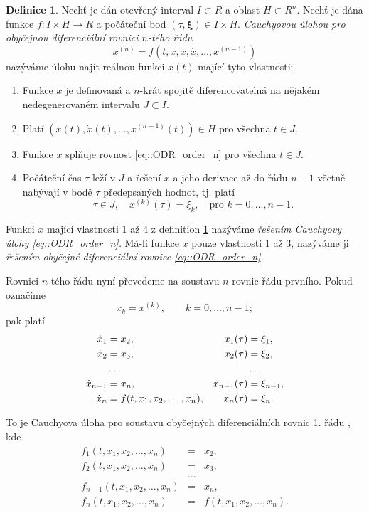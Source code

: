 \documentclass[a4paper, 12pt]{book}
\theoremstyle{definition}
\newtheorem{definition}[theorem]{Definice}
\def\to{\rightarrow}
\def\vc#1{\mathbf{\boldsymbol{#1}}}     %
\begin{document}
\begin{definition}
\label{def::rovnice_radu_n}
Nechť je dán otevřený interval $I\subset R$ a oblast $H\subset R^{n}$.  Nechť je dána funkce
$f:I\times H\to R$ a počáteční bod $(\tau, \vc \xi) \in I\times H$. \emph{Cauchyovou 
úlohou pro obyčejnou diferenciální rovnici $n$-tého řádu}
\begin{equation}
    \label{eq::ODR_order_n}
    x^{(n)} = f(t,x,\dot x, \ddot x,\dots,x^{(n-1)})
\end{equation}
nazýváme úlohu najít reálnou funkci $x(t)$ mající tyto vlastnosti:
\begin{enumerate}
\item Funkce $x$ je definovaná a $n$-krát spojitě diferencovatelná na nějakém
nedegenerovaném intervalu $J\subset I$.
\item Platí $(x(t),\dot x(t),\dots, x^{(n-1)}(t))\in H$ pro všechna $t\in J$.
\item Funkce $x$ splňuje rovnost \eqref{eq::ODR_order_n}
pro všechna $t\in J$.
\item Počáteční čas $\tau$ leží v $J$ a řešení $x$ a jeho derivace až do
řádu $n-1$ včetně nabývají v bodě $\tau$ předepsaných hodnot, tj. platí
\[
\tau\in J,\quad x^{(k)}(\tau)=\xi_k, \quad \text{pro } k=0,\dots, n-1.
\]
\end{enumerate}
\end{definition}

Funkci $x$ mající vlastnosti 1 až 4 z definition \ref{def::rovnice_radu_n} nazýváme 
\emph{řešením Cauchyovy úlohy \eqref{eq::ODR_order_n}.} Má-li funkce $x$ pouze vlastnosti
1 až 3, nazýváme ji \emph{řešením obyčejné diferenciální rovnice \eqref{eq::ODR_order_n}.}

Rovnici $n$-tého řádu nyní převedeme na soustavu $n$ rovnic řádu prvního. Pokud označíme
\[
    x_k = x^{(k)}, \qquad k=0,\dots,n-1;
\]
pak platí
\begin{align*}
\label{eq::soustava_n_rad} 
%
\dot x_1 &= x_2,& x_1(\tau)&=\xi_1, \\
\dot x_2 &= x_3,& x_2(\tau)&=\xi_2, \\
\notag
&\dots &&\dots \\
\dot x_{n-1} &= x_n,& x_{n-1}(\tau)&=\xi_{n-1}, \\
\dot x_n &= f(t,x_1,x_2,\dots,x_n),& x_n(\tau)&=\xi_n.
\end{align*}

To je Cauchyova úloha pro soustavu obyčejných diferenciálních rovnic 1. řádu , kde
\begin{eqnarray*}
f_1(t,x_1,x_2,\dots,x_n) &=& x_2, \\
f_2(t,x_1,x_2,\dots,x_n) &=& x_3, \\
&\dots&\\
f_{n-1}(t,x_1,x_2,\dots,x_n) &=& x_n, \\
f_n(t,x_1,x_2,\dots,x_n) &=& f(t,x_1,x_2,\dots,x_n).
\end{eqnarray*}
\end{document}

